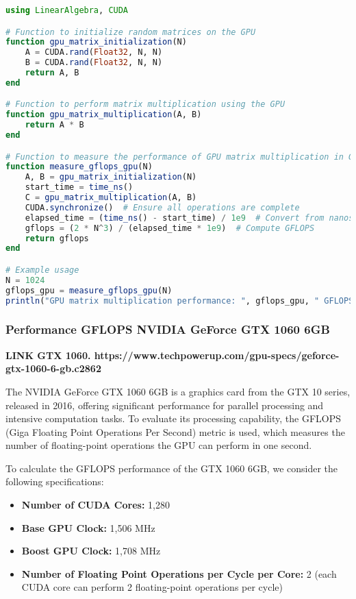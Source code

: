 \begin{lstlisting}[language=Julia]
using LinearAlgebra, CUDA

# Function to initialize random matrices on the GPU
function gpu_matrix_initialization(N)
    A = CUDA.rand(Float32, N, N)
    B = CUDA.rand(Float32, N, N)
    return A, B
end

# Function to perform matrix multiplication using the GPU
function gpu_matrix_multiplication(A, B)
    return A * B
end

# Function to measure the performance of GPU matrix multiplication in GFLOPS
function measure_gflops_gpu(N)
    A, B = gpu_matrix_initialization(N)
    start_time = time_ns()
    C = gpu_matrix_multiplication(A, B)
    CUDA.synchronize()  # Ensure all operations are complete
    elapsed_time = (time_ns() - start_time) / 1e9  # Convert from nanoseconds to seconds
    gflops = (2 * N^3) / (elapsed_time * 1e9)  # Compute GFLOPS
    return gflops
end

# Example usage
N = 1024
gflops_gpu = measure_gflops_gpu(N)
println("GPU matrix multiplication performance: ", gflops_gpu, " GFLOPS")
\end{lstlisting}


\newpage

\subsubsection{Performance GFLOPS NVIDIA GeForce GTX 1060 6GB}

\textbf{LINK GTX 1060. https://www.techpowerup.com/gpu-specs/geforce-gtx-1060-6-gb.c2862}

The NVIDIA GeForce GTX 1060 6GB is a graphics card from the GTX 10 series, released in 2016, offering significant performance for parallel processing and intensive computation tasks. To evaluate its processing capability, the GFLOPS (Giga Floating Point Operations Per Second) metric is used, which measures the number of floating-point operations the GPU can perform in one second.


To calculate the GFLOPS performance of the GTX 1060 6GB, we consider the following specifications:

\begin{itemize}
    \item \textbf{Number of CUDA Cores:} 1,280
    \item \textbf{Base GPU Clock:} 1,506 MHz
    \item \textbf{Boost GPU Clock:} 1,708 MHz
    \item \textbf{Number of Floating Point Operations per Cycle per Core:} 2 (each CUDA core can perform 2 floating-point operations per cycle)
\end{itemize}

